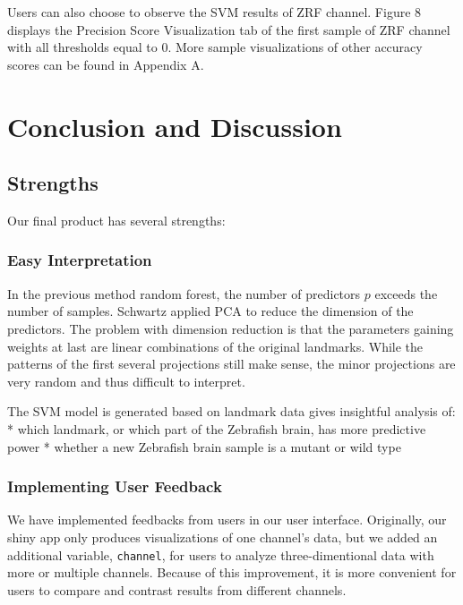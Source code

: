 \documentclass[10pt,letterpaper]{article}
\begin{document}
Users can also choose to observe the SVM results of ZRF channel. Figure
8 displays the Precision Score Visualization tab of the first sample of
ZRF channel with all thresholds equal to 0. More sample visualizations
of other accuracy scores can be found in Appendix A.

\section{Conclusion and Discussion}\label{conclusion-and-discussion}

\subsection{Strengths}\label{strengths}

Our final product has several strengths:

\subsubsection{Easy Interpretation}\label{easy-interpretation}

In the previous method random forest, the number of predictors \(p\)
exceeds the number of samples. Schwartz applied PCA to reduce the
dimension of the predictors. The problem with dimension reduction is
that the parameters gaining weights at last are linear combinations of
the original landmarks. While the patterns of the first several
projections still make sense, the minor projections are very random and
thus difficult to interpret.

The SVM model is generated based on landmark data gives insightful
analysis of: * which landmark, or which part of the Zebrafish brain, has
more predictive power * whether a new Zebrafish brain sample is a mutant
or wild type

\subsubsection{Implementing User
Feedback}\label{implementing-user-feedback}

We have implemented feedbacks from users in our user interface.
Originally, our shiny app only produces visualizations of one channel's
data, but we added an additional variable, \texttt{channel}, for users
to analyze three-dimentional data with more or multiple channels.
Because of this improvement, it is more convenient for users to compare
and contrast results from different channels.
\end{document}
